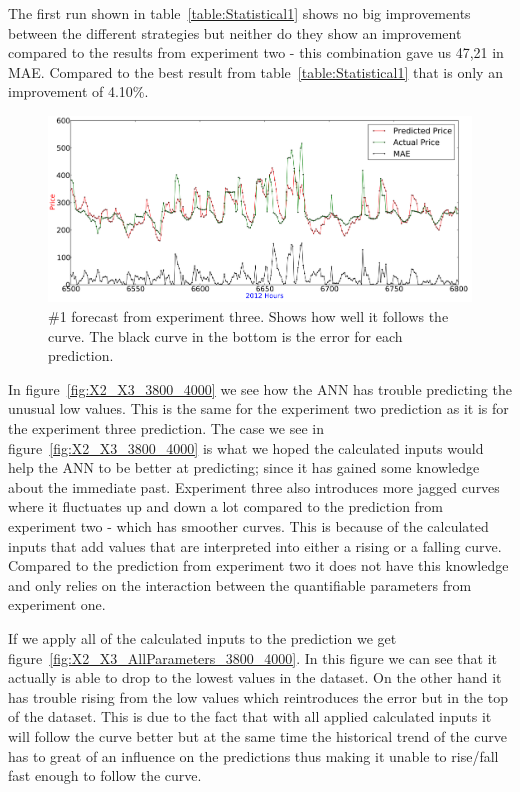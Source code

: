 The first run shown in table~\ref{table:Statistical1} shows no big improvements between the different strategies but neither do they show an improvement compared to the results from experiment two - this combination gave us 47,21 in MAE. Compared to the best result from table~\ref{table:Statistical1} that is only an improvement of 4.10\%.

\begin{figure}[H]
\centering
\includegraphics[width=\linewidth]{billeder/PriceExperimentalAnalysis/X3_Nr1_Best_skew_historical.png}
\caption{\#1 forecast from experiment three. Shows how well it follows the curve. The black curve in the bottom is the error for each prediction.}
\label{fig:X3_Best_With_MAE}
\end{figure}

In figure~\ref{fig:X2_X3_3800_4000} we see how the ANN has trouble predicting the unusual low values. This is the same for the experiment two prediction as it is for the experiment three prediction. The case we see in figure~\ref{fig:X2_X3_3800_4000} is what we hoped the calculated inputs would help the ANN to be better at predicting; since it has gained some knowledge about the immediate past. Experiment three also introduces more jagged curves where it fluctuates up and down a lot compared to the prediction from experiment two - which has smoother curves. This is because of the calculated inputs that add values that are interpreted into either a rising or a falling curve. Compared to the prediction from experiment two it does not have this knowledge and only relies on the interaction between the quantifiable parameters from experiment one.

If we apply all of the calculated inputs to the prediction we get figure~\ref{fig:X2_X3_AllParameters_3800_4000}. In this figure we can see that it actually is able to drop to the lowest values in the dataset. On the other hand it has trouble rising from the low values which reintroduces the error but in the top of the dataset. This is due to the fact that with all applied calculated inputs it will follow the curve better but at the same time the historical trend of the curve has to great of an influence on the predictions thus making it unable to rise/fall fast enough to follow the curve.

